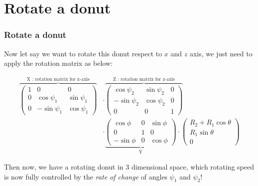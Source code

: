 \documentclass[12pt, t]{beamer}
\renewcommand{\emph}[1]{{\color{Turquoise3}\textsl{#1}}}
\begin{document}

\section{Rotate a donut}
\begin{frame}
    \frametitle{Rotate a donut}

    Now let say we want to rotate this donut respect to $x$ and $z$ axis, we just need to apply the
    rotation matrix as below:

    \begin{equation*}
        \begin{split}
            \overbrace{
                \begin{pmatrix}
                    1 & 0           & 0          \\
                    0 & \cos\psi_1  & \sin\psi_1 \\
                    0 & -\sin\psi_1 & \cos\psi_1
                \end{pmatrix}
            }^\text{X : rotation matrix for x-axis}
            &\cdot
            \overbrace{
                \begin{pmatrix}
                    \cos\psi_2  & \sin \psi_2 & 0 \\
                    -\sin\psi_2 & \cos \psi_2 & 0 \\
                    0           & 0           & 1
                \end{pmatrix}
            }^\text{Z : rotation matrix for z-axis}\\
            &\cdot
            \underbrace{
                \begin{pmatrix}
                    \cos\phi  & 0 & \sin\phi \\
                    0         & 1 & 0        \\
                    -\sin\phi & 0 & \cos\phi
                \end{pmatrix}
            }_\text{Y}
            \cdot
            \begin{pmatrix}
                R_2 + R_1\cos{\theta} \\
                R_1\sin{\theta}       \\
                0
            \end{pmatrix}
        \end{split}
    \end{equation*}

    Then now, we have a rotating donut in 3 dimensional space, which rotating speed is now fully
    controlled by the \emph{rate of change} of angles $\psi_1$ and $\psi_2$!

\end{frame}
\end{document}
